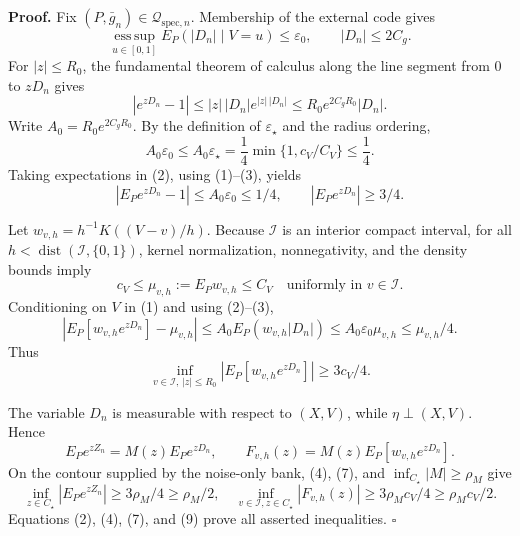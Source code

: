 \textbf{Proof.}
Fix \((P,\bar g_n)\in\mathcal Q_{\mathrm{spec},n}\). Membership of the external code gives
\[
 \operatorname*{ess\,sup}_{u\in[0,1]}
 E_P(|D_n|\mid V=u)\le\varepsilon_0,\qquad |D_n|\le2C_g. \tag{1}
\]
For \(|z|\le R_0\), the fundamental theorem of calculus along the line segment from \(0\) to \(zD_n\) gives
\[
 |e^{zD_n}-1|
 \le |z|\,|D_n|e^{|z|\,|D_n|}
 \le R_0e^{2C_gR_0}|D_n|. \tag{2}
\]
Write \(A_0=R_0e^{2C_gR_0}\). By the definition of \(\varepsilon_\star\) and the radius ordering,
\[
 A_0\varepsilon_0\le A_0\varepsilon_\star
 =\frac14\min\{1,c_V/C_V\}\le\frac14. \tag{3}
\]
Taking expectations in (2), using (1)--(3), yields
\[
 |E_Pe^{zD_n}-1|\le A_0\varepsilon_0\le1/4,
 \qquad |E_Pe^{zD_n}|\ge3/4. \tag{4}
\]

Let \(w_{v,h}=h^{-1}K((V-v)/h)\). Because \(\mathcal I\) is an interior compact interval, for all \(h<\operatorname{dist}(\mathcal I,\{0,1\})\), kernel normalization, nonnegativity, and the density bounds imply
\[
 c_V\le\mu_{v,h}:=E_Pw_{v,h}\le C_V
 \quad\text{uniformly in }v\in\mathcal I. \tag{5}
\]
Conditioning on \(V\) in (1) and using (2)--(3),
\[
 \left|E_P[w_{v,h}e^{zD_n}]-\mu_{v,h}\right|
 \le A_0E_P(w_{v,h}|D_n|)
 \le A_0\varepsilon_0\mu_{v,h}
 \le\mu_{v,h}/4. \tag{6}
\]
Thus
\[
 \inf_{v\in\mathcal I,\,|z|\le R_0}
 |E_P[w_{v,h}e^{zD_n}]|
 \ge3c_V/4. \tag{7}
\]

The variable \(D_n\) is measurable with respect to \((X,V)\), while \(\eta\perp(X,V)\). Hence
\[
 E_Pe^{zZ_n}=M(z)E_Pe^{zD_n},
 \qquad
 F_{v,h}(z)=M(z)E_P[w_{v,h}e^{zD_n}]. \tag{8}
\]
On the contour supplied by the noise-only bank, (4), (7), and \(\inf_{C_\star}|M|\ge\rho_M\) give
\[
 \inf_{z\in C_\star}|E_Pe^{zZ_n}|
 \ge3\rho_M/4\ge\rho_M/2,
 \quad
 \inf_{v\in\mathcal I,z\in C_\star}|F_{v,h}(z)|
 \ge3\rho_Mc_V/4\ge\rho_Mc_V/2. \tag{9}
\]
Equations (2), (4), (7), and (9) prove all asserted inequalities. \(\square\)